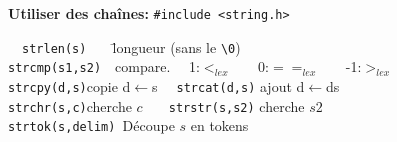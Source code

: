 \documentclass[a4paper,10pt,landscape]{article}
\begin{document}
\begin{minipage}{1.0\linewidth}
\begin{multicols}{3}
  \medskip
  \textbf{Utiliser des chaînes:} \verb=#include <string.h>= \vspace{-.6\baselineskip}
  \begin{tabbing}
    ~~\=\verb=strlen(s)   = \=longueur (sans le \verb=\0=)\\
    \>\verb=strcmp(s1,s2)=\>~~compare. ~~1:$<_{lex}$  ~~~0:$==_{lex}$ ~~~-1:$>_{lex}$\\
    \>\verb=strcpy(d,s)=\>copie d$\leftarrow$s \verb=  strcat(d,s)= ajout d$\leftarrow$ds\\
    \>\verb=strchr(s,c)=\>cherche $c$ \verb=   strstr(s,s2)= cherche $s2$\\
    \>\verb=strtok(s,delim) =Découpe $s$ en tokens
  \end{tabbing}
\end{multicols}  
\end{minipage}%
\begin{minipage}{.1\linewidth}  
\end{minipage}

\setlength\columnseprule{0pt}
\end{document}
